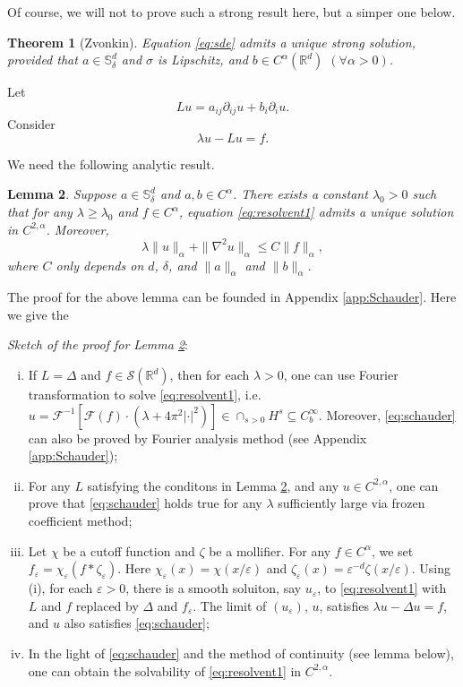 \documentclass[twoside, 12pt]{book}
\numberwithin{equation}{chapter}
\newtheorem{theorem}{Theorem}[section]
\newtheorem{lemma}[theorem]{Lemma}
\def\cF{{\mathcal F}}
\def\mR{{\mathbb R}}
\def\mS{{\mathbb S}}
\def\sS{{\mathscr S}}
\def\l{\left}
\def\r{\right}
\def\geq{\geqslant}
\def\leq{\leqslant}
\def\p{\partial}
\def\eps{\varepsilon}
\begin{document}
	Of course, we will not to prove such a strong result here, but a simper one below. 
	\begin{theorem}[Zvonkin]\label{thm:Zvonkin}
		Equation \eqref{eq:sde} admits a unique strong solution, provided that $a\in \mS_\delta^d$ and $\sigma$ is Lipschitz, and $b\in C^\alpha(\mR^d)$ $(\forall \alpha>0)$. 
	\end{theorem}
	
	Let 
	\[
	Lu= a_{ij} \p_{ij} u+b_i\p_i u. 
	\] 
	Consider 
	\begin{equation}\label{eq:resolvent1}
		\lambda u - L u =f. 
	\end{equation}

	We need the following analytic result. 
	\begin{lemma}\label{lem:Schauder}
		Suppose $a\in \mS_\delta^d$ and $a, b\in C^\alpha$. There exists a constant $\lambda_0>0$ such that for any $\lambda\geq \lambda_0$ and $f\in C^\alpha$, equation \eqref{eq:resolvent1} admits a unique solution in $C^{2,\alpha}$. Moreover, 
		\begin{equation}\label{eq:schauder}
			\lambda \|u\|_{\alpha} + \|\nabla^2 u\|_\alpha \leq C \|f\|_{\alpha}, 
		\end{equation}
		where $C$ only depends on $d$, $\delta$, and $\|a\|_\alpha$ and $\|b\|_{\alpha}$. 
	\end{lemma}
	The proof for the above lemma can be founded in Appendix \ref{app:Schauder}. Here we give the 
	
	{\em Sketch of the proof for Lemma \ref{lem:Schauder}}: 
	\begin{enumerate}[(i)]
		\item If $L=\Delta$ and $f\in \sS(\mR^d)$, then for each $\lambda>0$, one can use Fourier transformation to solve \eqref{eq:resolvent1}, i.e. $u=\cF^{-1}\l[ \cF(f)\cdot(\lambda + 4\pi^2 |\cdot|^2) \r]\in \cap_{s>0} H^s\subseteq C^\infty_b$. Moreover, \eqref{eq:schauder} can also be proved by Fourier analysis method (see Appendix \ref{app:Schauder}); 
		\item For any $L$ satisfying the conditons in Lemma \ref{lem:Schauder}, and any $u\in C^{2,\alpha}$, one can prove that \eqref{eq:schauder} holds true for any $\lambda$ sufficiently large via frozen coefficient method; 
		\item Let $\chi$ be a cutoff function and $\zeta$ be a mollifier. For any $f\in C^\alpha$, we set $f_\eps=\chi_\eps(f*\zeta_\eps)$. Here $\chi_\eps(x)=\chi(x/\eps)$ and $\zeta_\eps(x)= \eps^{-d} \zeta(x/\eps)$. Using (i), for each $\eps>0$, there is a smooth soluiton, say $u_\eps$, to \eqref{eq:resolvent1} with $L$ and $f$ replaced by $\Delta$ and $f_\eps$. The limit of $(u_\eps)$, $u$, satisfies $\lambda u-\Delta u=f$, and $u$ also satisfies \eqref{eq:schauder}; 
		\item In the light of \eqref{eq:schauder} and the method of continuity (see lemma below), one can obtain the solvability of \eqref{eq:resolvent1} in $C^{2,\alpha}$. 
	\end{enumerate}
	
\end{document}
